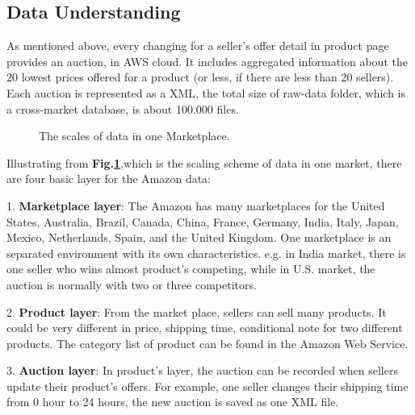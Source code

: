 \subsection{Data Understanding}
\label{sec:datafirstlook}
As mentioned above, every changing for a seller's offer detail in product page provides an auction, in AWS cloud. It includes aggregated information about the 20 lowest prices offered for a product (or less, if there are less than 20 sellers). Each auction is represented as a XML, the total size of raw-data folder, which is a cross-market database, is about 100.000 files. 
\begin{figure}[!h]
	\begin{center}
	\end{center}
	\caption{\label{fig:scale}The scales of data in one Marketplace.}
\end{figure}

Illustrating from \textbf{Fig.\ref{fig:scale}},which is the scaling scheme of data in one market, there are four basic layer for the Amazon data:

1. \textbf{Marketplace layer}: The Amazon has many marketplaces for
the United States, Australia, Brazil, Canada, China, France, Germany, India, Italy, Japan, Mexico, Netherlands, Spain, and the United Kingdom. One marketplace is an separated  environment with its own characteristics.  e.g. in India market, there is one seller who wins almost product's competing, while in U.S. market, the auction is normally with two or three competitors.

2. \textbf{Product layer}: From the market place, sellers can sell many products. It could be very different in price, shipping time, conditional note for two different products. The category list of product can be found in the Amazon Web Service.

3. \textbf{Auction layer}: In product's layer, the auction can be recorded when sellers update their product's offers. For example, one seller changes their shipping time from 0 hour to 24 hours, the new auction is saved as one XML file.


